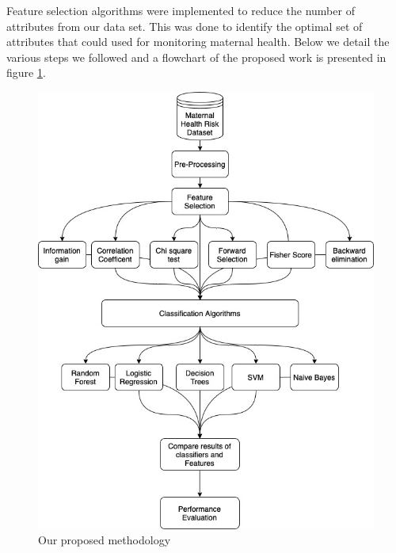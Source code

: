 \documentclass[conference]{IEEEtran}
\begin{document}
Feature selection algorithms were implemented to reduce the number of attributes from our data set. This was done to identify the optimal set of attributes that could used for monitoring maternal health.
Below we detail the various steps we followed and a flowchart of the proposed work is presented in figure \ref{fig:proposal}.
\begin{figure}[!h]
    \centering
    \includegraphics[width=\columnwidth]{Diagram.drawio.jpeg}
    \caption{Our proposed methodology }
    \label{fig:proposal}
\end{figure}
\end{document}
